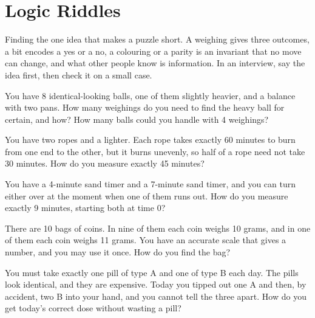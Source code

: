 \chapter{Logic Riddles}\label{ch:iv1:logic-riddles}

\begin{ivtrains}
Finding the one idea that makes a puzzle short. A weighing gives three outcomes, a bit encodes a yes or a no, a colouring or a parity is an invariant that no move can change, and what other people know is information. In an interview, say the idea first, then check it on a small case.
\end{ivtrains}

\begin{question}\label{iq:iv1:logic-riddles:1}
You have 8 identical-looking balls, one of them slightly heavier, and a balance with two pans. How many weighings do you need to find the heavy ball for certain, and how? How many balls could you handle with 4 weighings?
\end{question}

\begin{question}\label{iq:iv1:logic-riddles:2}
You have two ropes and a lighter. Each rope takes exactly 60 minutes to burn from one end to the other, but it burns unevenly, so half of a rope need not take 30 minutes. How do you measure exactly 45 minutes?
\end{question}

\begin{question}\label{iq:iv1:logic-riddles:3}
You have a 4-minute sand timer and a 7-minute sand timer, and you can turn either over at the moment when one of them runs out. How do you measure exactly 9 minutes, starting both at time 0?
\end{question}

\begin{question}\label{iq:iv1:logic-riddles:4}
There are 10 bags of coins. In nine of them each coin weighs 10 grams, and in one of them each coin weighs 11 grams. You have an accurate scale that gives a number, and you may use it once. How do you find the bag?
\end{question}

\begin{question}\label{iq:iv1:logic-riddles:5}
You must take exactly one pill of type A and one of type B each day. The pills look identical, and they are expensive. Today you tipped out one A and then, by accident, two B into your hand, and you cannot tell the three apart. How do you get today's correct dose without wasting a pill?
\end{question}

